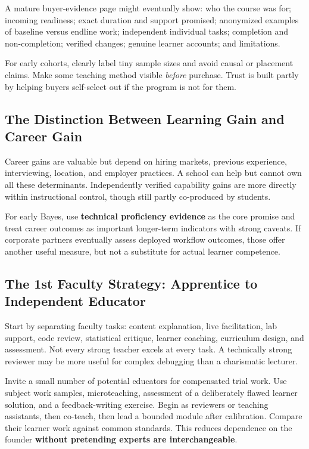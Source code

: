 A mature buyer-evidence page might eventually show: who the course was for; incoming readiness; exact duration and support promised; anonymized examples of baseline versus endline work; independent individual tasks; completion and non-completion; verified changes; genuine learner accounts; and limitations.

For early cohorts, clearly label tiny sample sizes and avoid causal or placement claims. Make some teaching method visible \textit{before} purchase. Trust is built partly by helping buyers self-select out if the program is not for them.

\subsection{The Distinction Between Learning Gain and Career Gain}
\label{sec:learning_gain_vs_career_gain}

Career gains are valuable but depend on hiring markets, previous experience, interviewing, location, and employer practices. A school can help but cannot own all these determinants. Independently verified capability gains are more directly within instructional control, though still partly co-produced by students.

For early Bayes, use \textbf{technical proficiency evidence} as the core promise and treat career outcomes as important longer-term indicators with strong caveats. If corporate partners eventually assess deployed workflow outcomes, those offer another useful measure, but not a substitute for actual learner competence.

\subsection{The 1st Faculty Strategy: Apprentice to Independent Educator}
\label{sec:first_faculty_strategy}

Start by separating faculty tasks: content explanation, live facilitation, lab support, code review, statistical critique, learner coaching, curriculum design, and assessment. Not every strong teacher excels at every task. A technically strong reviewer may be more useful for complex debugging than a charismatic lecturer.

Invite a small number of potential educators for compensated trial work. Use subject work samples, microteaching, assessment of a deliberately flawed learner solution, and a feedback-writing exercise. Begin as reviewers or teaching assistants, then co-teach, then lead a bounded module after calibration. Compare their learner work against common standards. This reduces dependence on the founder \textbf{without pretending experts are interchangeable}.

